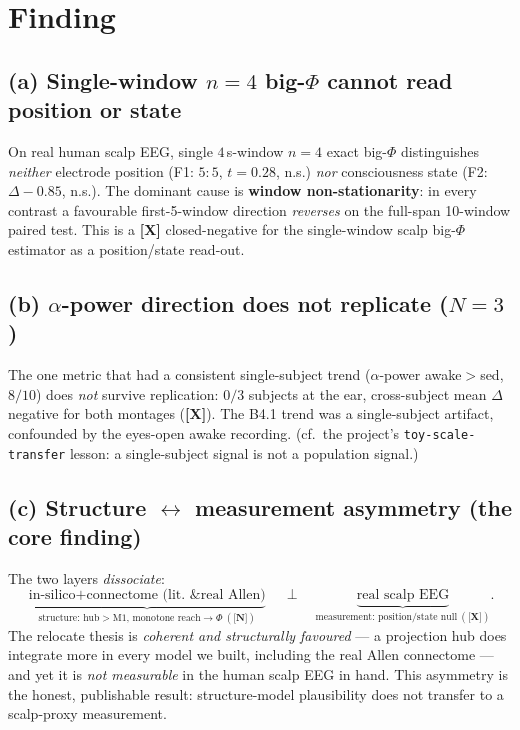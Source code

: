 \documentclass[11pt,a4paper]{article}
\providecommand{\tierGreen}{\textbf{[N]}}   %
\providecommand{\tierRed}{\textbf{[X]}}     %
\begin{document}
\section{Finding}\label{sec:finding}

\subsection{(a) Single-window $n{=}4$ big-$\Phi$ cannot read position or state}
On real human scalp EEG, single $4\,$s-window $n{=}4$ exact big-$\Phi$
distinguishes \emph{neither} electrode position (F1: $5{:}5$, $t{=}0.28$, n.s.)
\emph{nor} consciousness state (F2: $\Delta{-}0.85$, n.s.). The dominant cause
is \textbf{window non-stationarity}: in every contrast a favourable
first-5-window direction \emph{reverses} on the full-span 10-window paired test.
This is a \tierRed{} closed-negative for the single-window scalp big-$\Phi$
estimator as a position/state read-out.

\subsection{(b) $\alpha$-power direction does not replicate ($N{=}3$)}
The one metric that had a consistent single-subject trend ($\alpha$-power
awake$>$sed, $8/10$) does \emph{not} survive replication: $0/3$ subjects at the
ear, cross-subject mean $\Delta$ negative for both montages (\tierRed). The
B4.1 trend was a single-subject artifact, confounded by the eyes-open awake
recording. (cf.\ the project's \texttt{toy-scale-transfer} lesson: a
single-subject signal is not a population signal.)

\subsection{(c) Structure $\leftrightarrow$ measurement asymmetry (the core finding)}
The two layers \emph{dissociate}:
\[
\underbrace{\text{in-silico} + \text{connectome (lit.\ \& real Allen)}}_{\text{structure: hub}>\text{M1, monotone reach}\to\Phi\ (\tierGreen)}
\quad\perp\quad
\underbrace{\text{real scalp EEG}}_{\text{measurement: position/state null}\ (\tierRed)}.
\]
The relocate thesis is \emph{coherent and structurally favoured} --- a
projection hub does integrate more in every model we built, including the real
Allen connectome --- and yet it is \emph{not measurable} in the human scalp EEG
in hand. This asymmetry is the honest, publishable result: structure-model
plausibility does not transfer to a scalp-proxy measurement.
\end{document}
